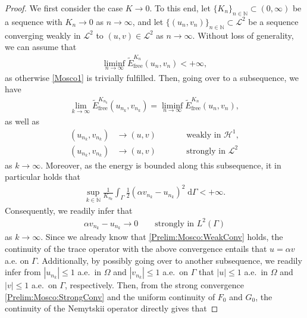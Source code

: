 \documentclass[11pt,reqno]{amsart}
\theoremstyle{remark}
\numberwithin{equation}{section}
\newcommand{\abs}[1]{|#1|}
\newcommand{\N}{\mathbb N}
\newcommand{\intG}{\int_\Gamma}
\newcommand{\dG}{\;\mathrm d\Ga}
\newcommand{\Om}{\Omega}
\newcommand{\Ga}{\Gamma}
\newcommand{\free}{\mathrm{free}}
\begin{document}
\begin{proof}
    We first consider the case $K\rightarrow 0$. To this end, let $\{K_n\}_{n\in\N}\subset(0,\infty)$ be a sequence with $K_n\rightarrow 0$ as $n\rightarrow\infty$, and let $\{(u_n,v_n)\}_{n\in\N}\subset\mathcal{L}^2$ be a sequence converging weakly in $\mathcal{L}^2$ to $(u,v)\in\mathcal{L}^2$ as $n\rightarrow\infty$. Without loss of generality, we can assume that 
    \begin{align*}
        \liminf_{n\rightarrow\infty} \widetilde E_\free^{K_n}(u_n,v_n) < + \infty,
    \end{align*}
    as otherwise \ref{Mosco1} is trivially fulfilled. Then, going over to a subsequence, we have 
    \begin{align*}
        \lim_{k\rightarrow\infty} \widetilde E_\free^{K_{n_k}}(u_{n_k},v_{n_k}) = \liminf_{n\rightarrow\infty} \widetilde E_\free^{K_n}(u_n,v_n),
    \end{align*}
    as well as
    \begin{subequations}
        \begin{alignat}{2}
            (u_{n_k},v_{n_k}) &\rightarrow (u,v) &&\qquad\text{weakly in~}\mathcal{H}^1, \label{Prelim:Mosco:WeakConv} \\
            (u_{n_k},v_{n_k}) &\rightarrow (u,v) &&\qquad \text{strongly in~}\mathcal{L}^2 \label{Prelim:Mosco:StrongConv}
        \end{alignat}
    \end{subequations}
    as $k\rightarrow\infty$. Moreover, as the energy is bounded along this subsequence, it in particular holds that
    \begin{align}
        \sup_{k\in\N} \frac{1}{K_{n_k}}\intG \frac12(\alpha v_{n_k} - u_{n_k})^2\dG < +\infty.
    \end{align}
    Consequently, we readily infer that
    \begin{align*}
        \alpha v_{n_k} - u_{n_k} \rightarrow 0 \qquad\text{strongly in~}L^2(\Ga)
    \end{align*}
    as $k\rightarrow\infty$. Since we already know that \eqref{Prelim:Mosco:WeakConv} holds, the continuity of the trace operator with the above convergence entails that $u = \alpha v$ a.e. on $\Ga$. Additionally, by possibly going over to another subsequence, we readily infer from $\abs{u_{n_k}}\leq 1$ a.e.~in $\Om$ and $\abs{v_{n_k}}\leq 1$ a.e.~on $\Ga$ that $\abs{u}\leq 1$ a.e.~in $\Om$ and $\abs{v}\leq 1$ a.e.~on $\Ga$, respectively. Then, from the strong convergence \eqref{Prelim:Mosco:StrongConv} and the uniform continuity of $F_0$ and $G_0$, the continuity of the Nemytskii operator directly gives that

\end{proof}
\end{document}

